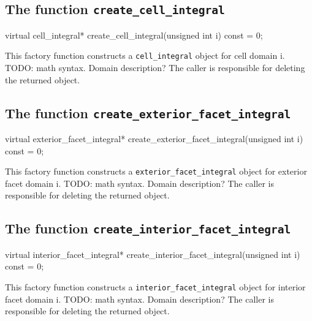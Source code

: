 \subsection{The function \texttt{create\_cell\_integral}}

\begin{code}
virtual cell_integral* create_cell_integral(unsigned int i) const = 0;
\end{code}

This factory function constructs a \texttt{cell\_integral} object for cell domain i.
TODO: math syntax. Domain description?
The caller is responsible for deleting the returned object.

\subsection{The function \texttt{create\_exterior\_facet\_integral}}

\begin{code}
virtual exterior_facet_integral* create_exterior_facet_integral(unsigned int i) const = 0;
\end{code}

This factory function constructs a \texttt{exterior\_facet\_integral} object for exterior facet domain i.
TODO: math syntax. Domain description?
The caller is responsible for deleting the returned object.

\subsection{The function \texttt{create\_interior\_facet\_integral}}

\begin{code}
virtual interior_facet_integral* create_interior_facet_integral(unsigned int i) const = 0;
\end{code}

This factory function constructs a \texttt{interior\_facet\_integral} object for interior facet domain i.
TODO: math syntax. Domain description?
The caller is responsible for deleting the returned object.

